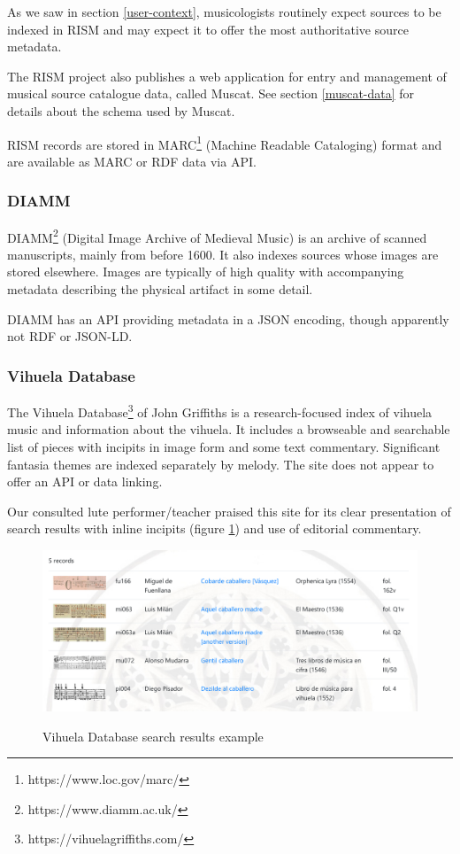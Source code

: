 \documentclass[sigconf, nonacm=true]{acmart}
\begin{document}
\begin{sloppypar}
  As we saw in section \ref{user-context}, musicologists routinely
  expect sources to be indexed in RISM and may expect it to offer the
  most authoritative source metadata.

  The RISM project also publishes a web application for entry and
  management of musical source catalogue data, called Muscat. See
  section \ref{muscat-data} for details about the schema used by
  Muscat.

  RISM records are stored in MARC\footnote{https://www.loc.gov/marc/}
  (Machine Readable Cataloging) format and are available as MARC or
  RDF data via API.

  \subsubsection{DIAMM}

  DIAMM\footnote{https://www.diamm.ac.uk/} (Digital Image Archive of
  Medieval Music) is an archive of scanned manuscripts, mainly from
  before 1600. It also indexes sources whose images are stored
  elsewhere. Images are typically of high quality with accompanying
  metadata describing the physical artifact in some detail.

  DIAMM has an API providing metadata in a JSON encoding, though
  apparently not RDF or JSON-LD.
  
  \subsubsection{Vihuela Database}

  The Vihuela Database\footnote{https://vihuelagriffiths.com/} of John
  Griffiths is a research-focused index of vihuela music and
  information about the vihuela. It includes a browseable and
  searchable list of pieces with incipits in image form and some text
  commentary. Significant fantasia themes are indexed separately by
  melody. The site does not appear to offer an API or data linking.

  Our consulted lute performer/teacher praised this site for its clear
  presentation of search results with inline incipits (figure
  \ref{fig:vihuela}) and use of editorial commentary.
  
  \begin{figure}[h]
  \centering
  \caption{Vihuela Database search results example}
  \includegraphics[width=\columnwidth]{images/vihuela-search-results}
  \label{fig:vihuela}
  \end{figure}
  

\end{sloppypar}
\end{document}
